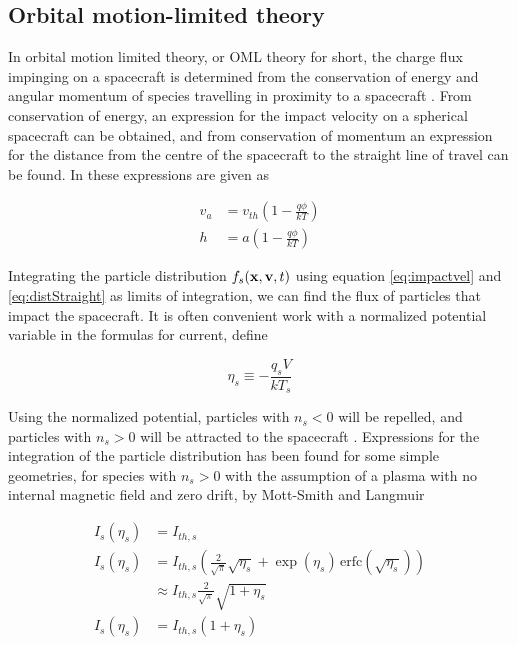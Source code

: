 \subsection*{Orbital motion-limited theory}
In orbital motion limited theory, or OML theory for short, the charge flux impinging on a spacecraft is determined from the conservation of energy and angular momentum of species travelling in proximity to a spacecraft . From conservation of energy, an expression for the impact velocity on a spherical spacecraft can be obtained, and from conservation of momentum an expression for the distance from the centre of the spacecraft to the straight line of travel can be found. In  these expressions are given as 

\begin{subequations}
    \begin{align}
        v_a &= v_{th} \left(1 - \frac{q \phi}{kT} \right) \label{eq:impactvel} \\
        h &= a \left(1 - \frac{q \phi}{kT} \right) \label{eq:distStraight}
    \end{align}
\end{subequations}

Integrating the particle distribution $f_s(\vb{x}, \vb{v}, t)$ using equation \ref{eq:impactvel} and \ref{eq:distStraight} as limits of integration, we can find the flux of particles that impact the spacecraft. It is often convenient work with a normalized potential variable in the formulas for current, define

\begin{equation}\label{eq:normPot}
    \eta_s \equiv - \frac{q_s V}{k T_s}
\end{equation}

Using the normalized potential, particles with $n_s < 0$ will be repelled, and particles with $n_s > 0$ will be attracted to the spacecraft . Expressions for the integration of the particle distribution has been found for some simple geometries, for species with $n_s > 0$ with the assumption of a plasma with no internal magnetic field and zero drift, by Mott-Smith and Langmuir 

\begin{subequations}
    \begin{align}
        I_s (\eta_s) &= I_{th,s} \label{eq:IPlane} \\
        I_s (\eta_s) &= I_{th,s} \left(\frac{2}{\sqrt{\pi}} \sqrt{\eta_s} + \exp(\eta_s) \hspace{2pt} \text{erfc}(\sqrt{\eta_s}) \right) \label{eq:ICylinder}\\
        & \approx I_{th,s} \frac{2}{\sqrt{\pi}} \sqrt{1 + \eta_s} \\
        I_s(\eta_s)  &= I_{th,s} (1 + \eta_s) \label{eq:Isphere}
    \end{align}
\end{subequations}

